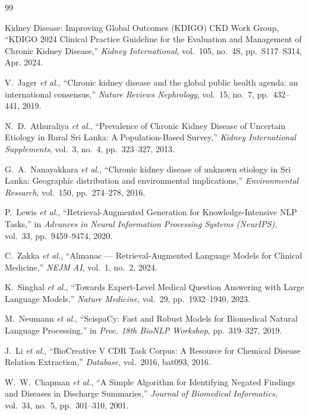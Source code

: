 \documentclass[12pt,a4paper]{report}
\begin{document}
\begin{thebibliography}{99}

Kidney Disease: Improving Global Outcomes (KDIGO) CKD Work Group,
``KDIGO 2024 Clinical Practice Guideline for the Evaluation and Management of Chronic Kidney Disease,''
\textit{Kidney International}, vol.~105, no.~4S, pp.~S117--S314, Apr. 2024.

V.~Jager \textit{et al.},
``Chronic kidney disease and the global public health agenda: an international consensus,''
\textit{Nature Reviews Nephrology}, vol.~15, no.~7, pp.~432--441, 2019.

N.~D.~Athuraliya \textit{et al.},
``Prevalence of Chronic Kidney Disease of Uncertain Etiology in Rural Sri Lanka: A Population-Based Survey,''
\textit{Kidney International Supplements}, vol.~3, no.~4, pp.~323--327, 2013.

G.~A.~Nanayakkara \textit{et al.},
``Chronic kidney disease of unknown etiology in Sri Lanka: Geographic distribution and environmental implications,''
\textit{Environmental Research}, vol.~150, pp.~274--278, 2016.

P.~Lewis \textit{et al.},
``Retrieval-Augmented Generation for Knowledge-Intensive NLP Tasks,''
in \textit{Advances in Neural Information Processing Systems (NeurIPS)}, vol.~33, pp.~9459--9474, 2020.

C.~Zakka \textit{et al.},
``Almanac --- Retrieval-Augmented Language Models for Clinical Medicine,''
\textit{NEJM AI}, vol.~1, no.~2, 2024.

K.~Singhal \textit{et al.},
``Towards Expert-Level Medical Question Answering with Large Language Models,''
\textit{Nature Medicine}, vol.~29, pp.~1932--1940, 2023.

M.~Neumann \textit{et al.},
``ScispaCy: Fast and Robust Models for Biomedical Natural Language Processing,''
in \textit{Proc. 18th BioNLP Workshop}, pp.~319--327, 2019.

J.~Li \textit{et al.},
``BioCreative V CDR Task Corpus: A Resource for Chemical Disease Relation Extraction,''
\textit{Database}, vol.~2016, bat093, 2016.

W.~W.~Chapman \textit{et al.},
``A Simple Algorithm for Identifying Negated Findings and Diseases in Discharge Summaries,''
\textit{Journal of Biomedical Informatics}, vol.~34, no.~5, pp.~301--310, 2001.


\end{thebibliography}
\end{document}
